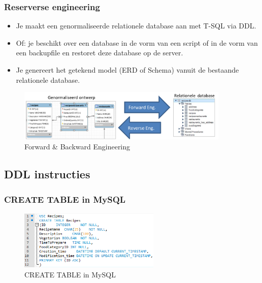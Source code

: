 \documentclass{article}
\begin{document}
\subsubsection{Reserverse engineering}
\begin{itemize}
    \item Je maakt een genormaliseerde relationele database aan met T-SQL via DDL.
    \item Of: je beschikt over een database in de vorm van een script of in de vorm van een backupfile en restoret deze database op de server.
    \item Je genereert het getekend model (ERD of Schema) vanuit de bestaande relationele database.
\end{itemize}

\begin{figure}[H]
    \centering
    \includegraphics[width=0.9\textwidth]{forward-backward-engineering.png}
    \caption{Forward \& Backward Engineering}
\end{figure}

\subsection{DDL instructies}
\subsubsection{CREATE TABLE in MySQL}
\begin{figure}[H]
    \centering
    \includegraphics[width=0.6\textwidth]{create-table.png}
    \caption{CREATE TABLE in MySQL}
\end{figure}
\end{document}
